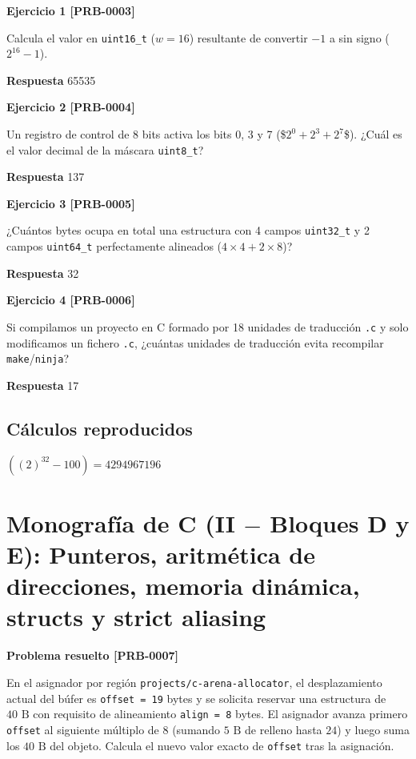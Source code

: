 \documentclass{book}
\begin{document}
\noindent\textbf{Ejercicio 1 [PRB-0003]}

Calcula el valor en \texttt{uint16\_t} (\(w = 16\)) resultante de convertir \(-1\) a sin signo (\(2^{16} - 1\)).

\noindent\textbf{Respuesta} 65535

\noindent\textbf{Ejercicio 2 [PRB-0004]}

Un registro de control de 8 bits activa los bits 0, 3 y 7 (\$\(2^0 + 2^3 + 2^7\)\$). ¿Cuál es el valor decimal de la máscara \texttt{uint8\_t}?

\noindent\textbf{Respuesta} 137

\noindent\textbf{Ejercicio 3 [PRB-0005]}

¿Cuántos bytes ocupa en total una estructura con 4 campos \texttt{uint32\_t} y 2 campos \texttt{uint64\_t} perfectamente alineados (\(4 \times 4 + 2 \times 8\))?

\noindent\textbf{Respuesta} 32

\noindent\textbf{Ejercicio 4 [PRB-0006]}

Si compilamos un proyecto en C formado por 18 unidades de traducción \texttt{.c} y solo modificamos un fichero \texttt{.c}, ¿cuántas unidades de traducción evita recompilar \texttt{make}/\texttt{ninja}?

\noindent\textbf{Respuesta} 17

\subsection*{Cálculos reproducidos}

\(\left(\left(2\right)^{32}-100\right) = 4294967196\)

\section{Monografía de C (II \(-\) Bloques D y E): Punteros, aritmética de direcciones, memoria dinámica, structs y strict aliasing}

\noindent\textbf{Problema resuelto [PRB-0007]}

En el asignador por región \texttt{projects/c-arena-allocator}, el desplazamiento actual del búfer es \texttt{offset = 19} bytes y se solicita reservar una estructura de \(40\text{ B}\) con requisito de alineamiento \texttt{align = 8} bytes. El asignador avanza primero \texttt{offset} al siguiente múltiplo de 8 (sumando \(5\text{ B}\) de relleno hasta \(24\)) y luego suma los \(40\text{ B}\) del objeto. Calcula el nuevo valor exacto de \texttt{offset} tras la asignación.
\end{document}
